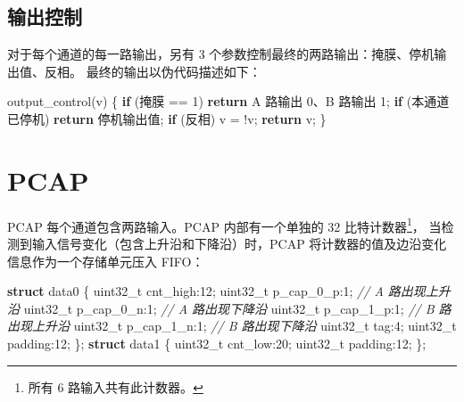 \documentclass[
  12pt,
]{book}
\newenvironment{Shaded}{\begin{snugshade}}{\end{snugshade}}
\newcommand{\CommentTok}[1]{\textcolor[rgb]{0.56,0.35,0.01}{\textit{#1}}}
\newcommand{\ControlFlowTok}[1]{\textcolor[rgb]{0.13,0.29,0.53}{\textbf{#1}}}
\newcommand{\DataTypeTok}[1]{\textcolor[rgb]{0.13,0.29,0.53}{#1}}
\newcommand{\DecValTok}[1]{\textcolor[rgb]{0.00,0.00,0.81}{#1}}
\newcommand{\KeywordTok}[1]{\textcolor[rgb]{0.13,0.29,0.53}{\textbf{#1}}}
\newcommand{\NormalTok}[1]{#1}
\begin{document}
\hypertarget{ux8f93ux51faux63a7ux5236}{%
\subsection{输出控制}\label{ux8f93ux51faux63a7ux5236}}

对于每个通道的每一路输出，另有 3 个参数控制最终的两路输出：掩膜、停机输出值、反相。
最终的输出以伪代码描述如下：

\begin{Shaded}
\begin{Highlighting}[]
\NormalTok{output_control(v)}
\NormalTok{\{}
    \ControlFlowTok{if}\NormalTok{ (掩膜 == }\DecValTok{1}\NormalTok{) }\ControlFlowTok{return}\NormalTok{ A 路输出 }\DecValTok{0}\NormalTok{、B 路输出 }\DecValTok{1}\NormalTok{;}
    \ControlFlowTok{if}\NormalTok{ (本通道已停机) }\ControlFlowTok{return}\NormalTok{ 停机输出值;}
    \ControlFlowTok{if}\NormalTok{ (反相) v = !v;}
    \ControlFlowTok{return}\NormalTok{ v;}
\NormalTok{\}}
\end{Highlighting}
\end{Shaded}

\hypertarget{pcap}{%
\section{PCAP}\label{pcap}}

PCAP 每个通道包含两路输入。PCAP 内部有一个单独的 32 比特计数器\footnote{所有 6 路输入共有此计数器。}，
当检测到输入信号变化（包含上升沿和下降沿）时，PCAP 将计数器的值及边沿变化信息作为一个存储单元压入
FIFO：

\begin{Shaded}
\begin{Highlighting}[]
\KeywordTok{struct}\NormalTok{ data0}
\NormalTok{\{}
    \DataTypeTok{uint32_t}\NormalTok{ cnt_high:}\DecValTok{12}\NormalTok{;}
    \DataTypeTok{uint32_t}\NormalTok{ p_cap_0_p:}\DecValTok{1}\NormalTok{; }\CommentTok{// A 路出现上升沿}
    \DataTypeTok{uint32_t}\NormalTok{ p_cap_0_n:}\DecValTok{1}\NormalTok{; }\CommentTok{// A 路出现下降沿}
    \DataTypeTok{uint32_t}\NormalTok{ p_cap_1_p:}\DecValTok{1}\NormalTok{; }\CommentTok{// B 路出现上升沿}
    \DataTypeTok{uint32_t}\NormalTok{ p_cap_1_n:}\DecValTok{1}\NormalTok{; }\CommentTok{// B 路出现下降沿}
    \DataTypeTok{uint32_t}\NormalTok{ tag:}\DecValTok{4}\NormalTok{;}
    \DataTypeTok{uint32_t}\NormalTok{ padding:}\DecValTok{12}\NormalTok{;}
\NormalTok{\};}
\KeywordTok{struct}\NormalTok{ data1}
\NormalTok{\{}
    \DataTypeTok{uint32_t}\NormalTok{ cnt_low:}\DecValTok{20}\NormalTok{;}
    \DataTypeTok{uint32_t}\NormalTok{ padding:}\DecValTok{12}\NormalTok{;}
\NormalTok{\};}
\end{Highlighting}
\end{Shaded}
\end{document}
